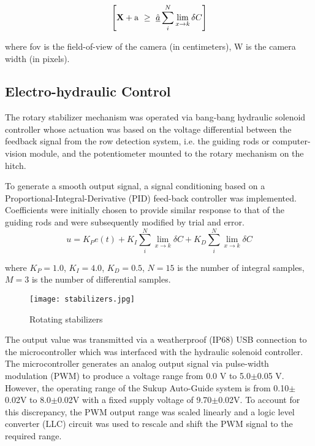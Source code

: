 \begin{flushleft}
\begin{flushleft}
\begin{equation}
  \left[
    {\bf X} + {\rm a} \ \geq\ 
    \underline{\hat a} \sum_i^N \lim_{x \rightarrow k} \delta C
  \right]
  \label{eq:px2mm}
\end{equation}
\begin{flushleft}
where fov is the field-of-view of the camera (in centimeters), W is
the camera width (in pixels).
\end{flushleft}

\subsection{Electro-hydraulic Control}
The rotary stabilizer mechanism was operated via bang-bang hydraulic
solenoid controller whose actuation was based on the voltage
differential between the feedback signal from the row detection
system, i.e. the guiding rods or computer-vision module, and the
potentiometer mounted to the rotary mechanism on the hitch.

To generate a smooth output signal, a signal conditioning based on a
Proportional-Integral-Derivative (PID) feed-back controller was
implemented. Coefficients were initially chosen to provide similar
response to that of the guiding rods and were subsequently modified by
trial and error.
\begin{equation}
    u = K_{P}e(t) + K_{I}\sum_i^N \lim_{x \rightarrow k} \delta C + K_{D}\sum_i^N \lim_{x \rightarrow k} \delta C
  \label{eq:pid}
\end{equation}
\begin{flushleft}
where $K_{P}=1.0$, $K_{I}=4.0$, $K_{D}=0.5$, $N=15$ is the number of integral samples,
$M=3$ is the number of differential samples.
\end{flushleft}

\begin{figure}
  \centering
  \texttt{[image: stabilizers.jpg]}
  \caption{Rotating stabilizers}
  \label{fig:stabilizers}
\end{figure}

The output value was transmitted via a weatherproof (IP68) USB
connection to the microcontroller which was interfaced with the
hydraulic solenoid controller. The microcontroller generates an analog
output signal via pulse-width modulation (PWM) to produce a voltage
range from 0.0 V to 5.0$\pm$0.05 V. However, the operating range of the
Sukup Auto-Guide system is from 0.10$\pm$0.02V to 8.0$\pm$0.02V with a fixed
supply voltage of 9.70$\pm$0.02V. To account for this discrepancy, the PWM
output range was scaled linearly and a logic level converter (LLC)
circuit was used to rescale and shift the PWM signal to the required
range.


\end{flushleft}
\end{flushleft}
